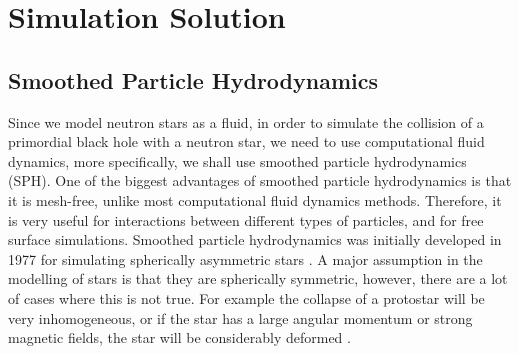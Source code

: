 %
%
% 
%
%
%
%
%

\chapter{Simulation Solution}
\label{chap:sim}

\section{Smoothed Particle Hydrodynamics}

Since we model neutron stars as a fluid, in order to simulate the collision of a primordial black hole with a neutron star, we need to use computational fluid dynamics, more specifically, we shall use smoothed particle hydrodynamics (SPH). One of the biggest advantages of smoothed particle hydrodynamics is that it is mesh-free, unlike most computational fluid dynamics methods. Therefore, it is very useful for interactions between different types of particles, and for free surface simulations. Smoothed particle hydrodynamics was initially developed in 1977 for simulating spherically asymmetric stars \cite{origsph}. A major assumption in the modelling of stars is that they are spherically symmetric, however, there are a lot of cases where this is not true. For example the collapse of a protostar will be very inhomogeneous, or if the star has a large angular momentum or strong magnetic fields, the star will be considerably deformed \cite{origsph}. \\

